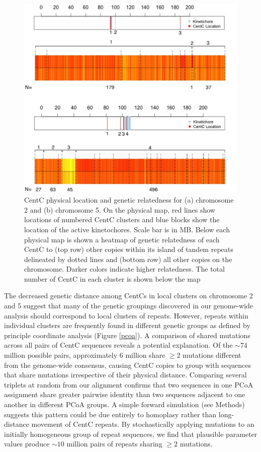 \begin{figure}[h]
\centering
\includegraphics[width=1\textwidth]{Fig3_Heatmap}
\caption{CentC physical location and genetic relatedness for (a) chromosome 2 and (b) chromosome 5.  On the physical map, red lines show locations of numbered CentC clusters and blue blocks show the location of the active kinetochores.  Scale bar is in MB.  Below each physical map is shown a heatmap of genetic relatedness of each CentC to (top row) other copies within its island of tandem repeats delineated by dotted lines and (bottom row) all other copies on the chromosome.  Darker colors indicate higher relatedness.  The total number of CentC in each cluster is shown below the map
}
\label{heatmap}    
\end{figure}

The decreased genetic distance among CentCs in local clusters on chromosome 2 and 5 suggest that many of the genetic groupings discovered in our genome-wide analysis should correspond to local clusters of repeats. 
However, repeats within individual clusters are frequently found in different genetic groups as defined by principle coordinate analysis (Figure \ref{pcoa}).  
A comparison of shared mutations across all pairs of CentC sequences reveals a potential explanation.  
Of the $\sim 74$ million possible pairs,  approximately 6 million share $\geq 2$ mutations different from the genome-wide consensus, causing CentC copies to group with sequences that share mutations irrespective of their physical distance.  
Comparing several triplets at random from our alignment confirms that two sequences in one PCoA assignment share greater pairwise identity than two sequences adjacent to one another in different PCoA groups.  
A simple forward simulation (see Methods) suggests this pattern could be due entirely to homoplasy rather than long-distance movement of CentC repeats.  
By stochastically applying mutations to an initially homogeneous group of repeat sequences, we find that plausible parameter values produce $\sim 10$ million pairs of repeats sharing $\geq 2$ mutations.

